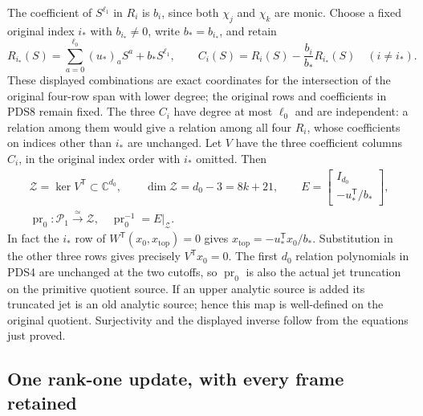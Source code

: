 \documentclass[10pt]{article}
\begin{document}
The coefficient of $S^{\ell_1}$ in $R_i$ is $b_i$, since both
$\chi_j$ and $\chi_k$ are monic. Choose a fixed original index
$i_*$ with $b_{i_*}\ne0$, write $b_*=b_{i_*}$, and retain
\[
 R_{i_*}(S)=\sum_{a=0}^{\ell_0}(u_*)_aS^a+b_*S^{\ell_1},\qquad
 C_i(S)=R_i(S)-\frac{b_i}{b_*}R_{i_*}(S)\quad(i\ne i_*).
\tag{PDS10}
\]
These displayed combinations are exact coordinates for the
intersection of the original four-row span with lower degree;
the original rows and coefficients in PDS8 remain fixed.
The three $C_i$ have degree at most $\ell_0$ and are independent:
a relation among them would give a relation among all four $R_i$,
whose coefficients on indices other than $i_*$ are unchanged.
Let $V$ have the three coefficient columns $C_i$, in the original
index order with $i_*$ omitted. Then
\[
 \begin{gathered}
 \mathcal Z=\ker V^{\mathsf T}\subset\mathbb C^{d_0},\qquad
 \dim\mathcal Z=d_0-3=8k+21,\qquad
 E=\begin{bmatrix}I_{d_0}\\ -u_*^{\mathsf T}/b_*\end{bmatrix},\\
 \operatorname{pr}_{0}:\mathcal P_1\xrightarrow{\ \simeq\ }\mathcal Z,
 \quad\operatorname{pr}_{0}^{-1}=E|_{\mathcal Z}.
 \end{gathered}
\tag{PDS11}
\]
In fact the $i_*$ row of $W^{\mathsf T}(x_0,x_\mathrm{top})=0$
gives $x_\mathrm{top}=-u_*^{\mathsf T}x_0/b_*$. Substitution in
the other three rows gives precisely $V^{\mathsf T}x_0=0$.
The first $d_0$ relation polynomials in PDS4 are unchanged at the
two cutoffs, so $\operatorname{pr}_0$ is also the actual jet
truncation on the primitive quotient source. If an upper analytic
source is added its truncated jet is an old analytic source; hence
this map is well-defined on the original quotient. Surjectivity
and the displayed inverse follow from the equations just proved.

\subsection{One rank-one update, with every frame retained}
\end{document}
